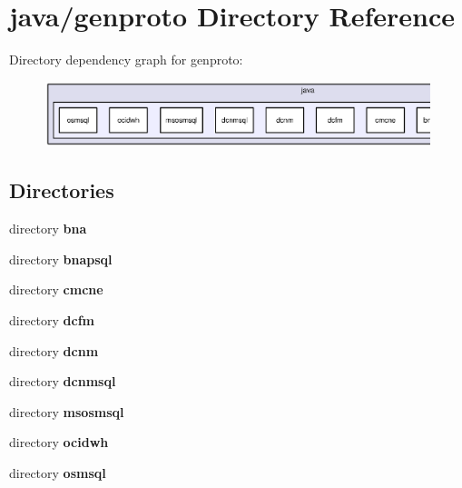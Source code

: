 \section{java/genproto Directory Reference}
\label{dir_0e43b3eaa74cb4b3a4cbe492a3c2d8cb}
Directory dependency graph for genproto\+:\nopagebreak
\begin{figure}[H]
\begin{center}
\leavevmode
\includegraphics[width=350pt]{dir_0e43b3eaa74cb4b3a4cbe492a3c2d8cb_dep}
\end{center}
\end{figure}
\subsection*{Directories}
\begin{DoxyCompactItemize}
\item 
directory {\bf bna}
\item 
directory {\bf bnapsql}
\item 
directory {\bf cmcne}
\item 
directory {\bf dcfm}
\item 
directory {\bf dcnm}
\item 
directory {\bf dcnmsql}
\item 
directory {\bf msosmsql}
\item 
directory {\bf ocidwh}
\item 
directory {\bf osmsql}
\end{DoxyCompactItemize}
